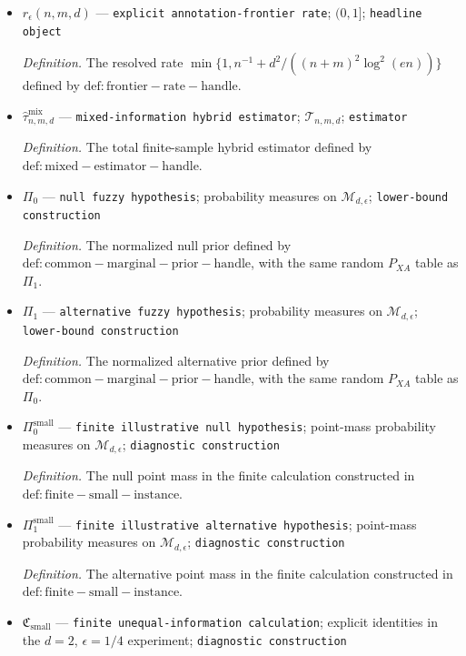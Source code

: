 \documentclass{article}
\begin{document}
\begin{itemize}
  \item \(r_\epsilon(n,m,d)\) --- \texttt{explicit annotation-\allowbreak{}frontier rate}; \((0,1]\); \texttt{headline object}
  \par\smallskip\noindent\emph{Definition.} The resolved rate \(\min\{1,n^{-1}+d^2/((n+m)^2\log^2(en))\}\) defined by \(\mathrm{def:frontier-rate-handle}\).
  \item \(\widehat\tau^{\mathrm{mix}}_{n,m,d}\) --- \texttt{mixed-\allowbreak{}information hybrid estimator}; \(\mathcal T_{n,m,d}\); \texttt{estimator}
  \par\smallskip\noindent\emph{Definition.} The total finite-sample hybrid estimator defined by \(\mathrm{def:mixed-estimator-handle}\).
  \item \(\Pi_0\) --- \texttt{null fuzzy hypothesis}; probability measures on \(\mathcal M_{d,\epsilon}\); \texttt{lower-\allowbreak{}bound construction}
  \par\smallskip\noindent\emph{Definition.} The normalized null prior defined by \(\mathrm{def:common-marginal-prior-handle}\), with the same random \(P_{XA}\) table as \(\Pi_1\).
  \item \(\Pi_1\) --- \texttt{alternative fuzzy hypothesis}; probability measures on \(\mathcal M_{d,\epsilon}\); \texttt{lower-\allowbreak{}bound construction}
  \par\smallskip\noindent\emph{Definition.} The normalized alternative prior defined by \(\mathrm{def:common-marginal-prior-handle}\), with the same random \(P_{XA}\) table as \(\Pi_0\).
  \item \(\Pi_0^{\mathrm{small}}\) --- \texttt{finite illustrative null hypothesis}; point-mass probability measures on \(\mathcal M_{d,\epsilon}\); \texttt{diagnostic construction}
  \par\smallskip\noindent\emph{Definition.} The null point mass in the finite calculation constructed in \(\mathrm{def:finite-small-instance}\).
  \item \(\Pi_1^{\mathrm{small}}\) --- \texttt{finite illustrative alternative hypothesis}; point-mass probability measures on \(\mathcal M_{d,\epsilon}\); \texttt{diagnostic construction}
  \par\smallskip\noindent\emph{Definition.} The alternative point mass in the finite calculation constructed in \(\mathrm{def:finite-small-instance}\).
  \item \(\mathfrak C_{\mathrm{small}}\) --- \texttt{finite unequal-\allowbreak{}information calculation}; explicit identities in the \(d=2\), \(\epsilon=1/4\) experiment; \texttt{diagnostic construction}

\end{itemize}
\end{document}
